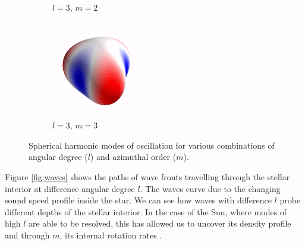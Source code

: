 \begin{figure}[ht]
\begin{subfigure}[b]{0.2\linewidth}
        \caption*{$l=3,\,m=2$}
    \end{subfigure}%
    \begin{subfigure}[b]{0.2\linewidth}
        \includegraphics[width=\linewidth]{introduction/images/3_3.png}
        \caption*{$l=3,\,m=3$}
    \end{subfigure}
    \caption{Spherical harmonic modes of oscillation for various combinations of angular degree ($l$) and azimuthal order ($m$).}
    \label{fig:modes}
\end{figure}

Figure \ref{fig:waves} shows the paths of wave fronts travelling through the stellar interior at difference angular degree $l$. The waves curve due to the changing sound speed profile inside the star. We can see how waves with difference $l$ probe different depths of the stellar interior. In the case of the Sun, where modes of high $l$ are able to be resolved, this has allowed us to uncover its density profile and through $m$, its internal rotation rates \citep{}.

